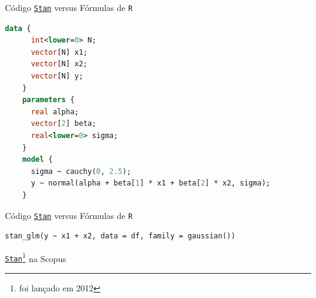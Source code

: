 \begin{frame}[fragile]{Código \href{https://mc-stan.org}{\texttt{Stan}} versus Fórmulas de \texttt{R}}
    \begin{lstlisting}[basicstyle=\small, language=Stan]
    data {
      int<lower=0> N;
      vector[N] x1;
      vector[N] x2;
      vector[N] y;
    }
    parameters {
      real alpha;
      vector[2] beta;
      real<lower=0> sigma;
    }
    model {
      sigma ~ cauchy(0, 2.5);
      y ~ normal(alpha + beta[1] * x1 + beta[2] * x2, sigma);
    }
    \end{lstlisting}
\end{frame}

\begin{frame}[fragile]{Código \href{https://mc-stan.org}{\texttt{Stan}} versus Fórmulas de \texttt{R}}
    \begin{lstlisting}
stan_glm(y ~ x1 + x2, data = df, family = gaussian())
    \end{lstlisting}
\end{frame}

\begin{frame}{\href{https://mc-stan.org}{\texttt{Stan}}\footnote{foi lançado em 2012} na Scopus}\
    \centering
\end{frame}

